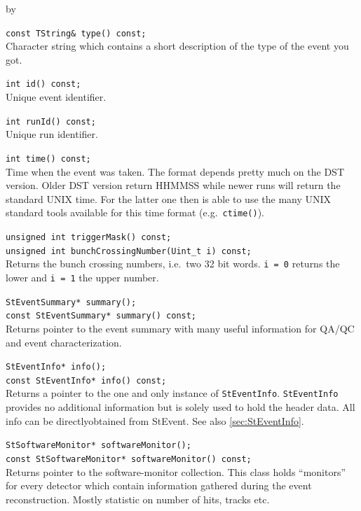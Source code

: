 \documentclass[twoside]{article}
\newcommand{\entrylabel}[1]{\mbox{\textbf{{#1}}}\hfil}%
\newenvironment{entry}
{\begin{list}{}%
    {\renewcommand{\makelabel}{\entrylabel}%
     \setlength{\labelwidth}{90pt}%
     \setlength{\leftmargin}{\labelwidth}
     \advance\leftmargin by \labelsep%
      }%
    }%
  {\end{list}}
\newcommand{\Entrylabel}[1]%
{\raisebox{0pt}[1ex][0pt]{\makebox[\labelwidth][l]%
    {\parbox[t]{\labelwidth}{\hspace{0pt}\textbf{{#1}}}}}}
\newenvironment{Entry}%
{\renewcommand{\entrylabel}{\Entrylabel}\begin{entry}}%
  {\end{entry}}
\begin{document}
\begin{Entry}
    \verb+const TString& type() const;+\\
    Character string which contains a short description of the type of
    the event you got.
    
    \verb+int id() const;+\\
    Unique event identifier.
    
    \verb+int runId() const;+\\
    Unique run identifier.
    
    \verb+int time() const;+\\
    Time when the event was taken. The format depends pretty much
    on the DST version. Older DST version return HHMMSS while newer
    runs will return the standard UNIX time. For the latter one then
    is able to use the many UNIX standard tools available for this
    time format (e.g.~\texttt{ctime()}).
    
    \verb+unsigned int triggerMask() const;+\\

    \verb+unsigned int bunchCrossingNumber(Uint_t i) const;+\\       
    Returns the bunch crossing numbers, i.e.~two 32 bit words.
    \texttt{i = 0} returns the lower and \texttt{i = 1} the upper number.

    \verb+StEventSummary* summary();+\\
    \verb+const StEventSummary* summary() const;+\\
    Returns pointer to the event summary with many useful information
    for QA/QC and event characterization.

    \verb+StEventInfo* info();+\\
    \verb+const StEventInfo* info() const;+\\
    Returns a pointer to the one and only instance of \texttt{StEventInfo}.
    \texttt{StEventInfo} provides no additional information but is solely
    used to hold the header data. All info can be directlyobtained  from
    StEvent. See also \ref{sec:StEventInfo}.

    \verb+StSoftwareMonitor* softwareMonitor();+\\
    \verb+const StSoftwareMonitor* softwareMonitor() const;+\\
    Returns pointer to the software-monitor collection. This class
    holds ``monitors'' for every detector which contain information
    gathered during the event reconstruction. Mostly statistic on
    number of hits, tracks etc.
    

\end{Entry}
\end{document}
